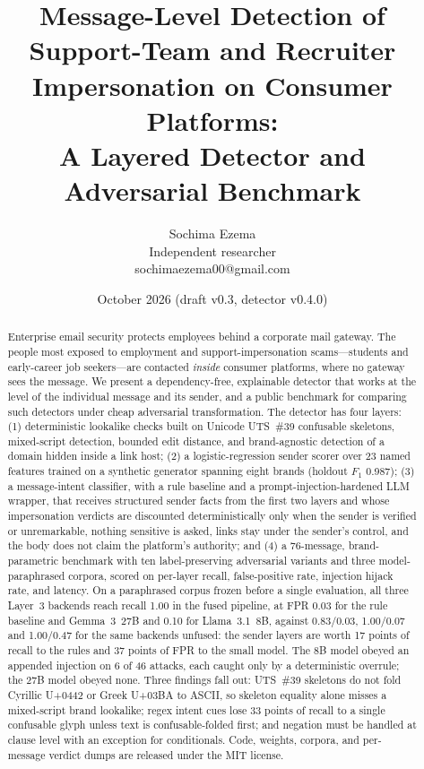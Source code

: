 \documentclass[10pt,twocolumn]{article}
\title{Message-Level Detection of Support-Team and Recruiter Impersonation on Consumer Platforms:\\ A Layered Detector and Adversarial Benchmark}
\author{Sochima Ezema\\ Independent researcher\\ sochimaezema00@gmail.com}
\date{October 2026 \quad(draft v0.3, detector v0.4.0)}
\newcommand{\cp}[1]{\mbox{U+#1}}
\begin{document}
\maketitle

\begin{abstract}
Enterprise email security protects employees behind a corporate mail gateway. The people most exposed to employment and support-impersonation scams---students and early-career job seekers---are contacted \emph{inside} consumer platforms, where no gateway sees the message. We present a dependency-free, explainable detector that works at the level of the individual message and its sender, and a public benchmark for comparing such detectors under cheap adversarial transformation. The detector has four layers: (1) deterministic lookalike checks built on Unicode UTS~\#39 confusable skeletons, mixed-script detection, bounded edit distance, and brand-agnostic detection of a domain hidden inside a link host; (2) a logistic-regression sender scorer over 23 named features trained on a synthetic generator spanning eight brands (holdout $F_1$ 0.987); (3) a message-intent classifier, with a rule baseline and a prompt-injection-hardened LLM wrapper, that receives structured sender facts from the first two layers and whose impersonation verdicts are discounted deterministically only when the sender is verified or unremarkable, nothing sensitive is asked, links stay under the sender's control, and the body does not claim the platform's authority; and (4) a 76-message, brand-parametric benchmark with ten label-preserving adversarial variants and three model-paraphrased corpora, scored on per-layer recall, false-positive rate, injection hijack rate, and latency. On a paraphrased corpus frozen before a single evaluation, all three Layer~3 backends reach recall 1.00 in the fused pipeline, at FPR 0.03 for the rule baseline and Gemma~3~27B and 0.10 for Llama~3.1~8B, against 0.83/0.03, 1.00/0.07 and 1.00/0.47 for the same backends unfused: the sender layers are worth 17 points of recall to the rules and 37 points of FPR to the small model. The 8B model obeyed an appended injection on 6 of 46 attacks, each caught only by a deterministic overrule; the 27B model obeyed none. Three findings fall out: UTS~\#39 skeletons do not fold Cyrillic \cp{0442} or Greek \cp{03BA} to ASCII, so skeleton equality alone misses a mixed-script brand lookalike; regex intent cues lose 33 points of recall to a single confusable glyph unless text is confusable-folded first; and negation must be handled at clause level with an exception for conditionals. Code, weights, corpora, and per-message verdict dumps are released under the MIT license.
\end{abstract}
\end{document}
